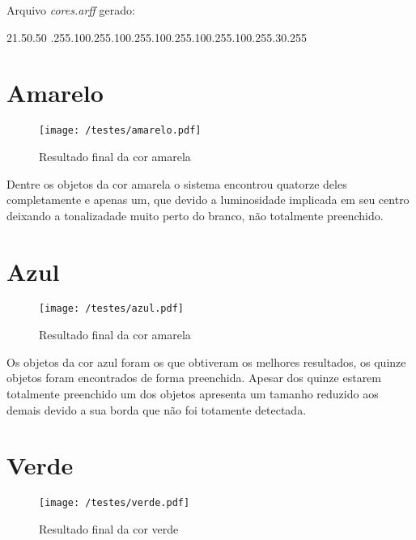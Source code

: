 	
Arquivo \textit{cores.arff} gerado:
\begin{center}
21.50.50 .255.100.255.100.255.100.255.100.255.100.255.30.255\newline
\end{center}
\section{Amarelo}
	\begin{figure}[H]
		\centering
		\texttt{[image: /testes/amarelo.pdf]}
		\caption{Resultado final da cor amarela}
		\label{disposicaoparte}
	\end{figure}
	
	Dentre os objetos da cor amarela o sistema encontrou quatorze deles completamente e apenas um, que devido a luminosidade implicada em seu centro deixando a tonalizadade muito perto do branco, não totalmente preenchido.
\section{Azul}
	\begin{figure}[H]
		\centering
		\texttt{[image: /testes/azul.pdf]}
		\caption{Resultado final da cor amarela}
		\label{disposicaoparte}
	\end{figure}

Os objetos da cor azul foram os que obtiveram os melhores resultados, os quinze objetos foram encontrados de forma preenchida.	Apesar dos quinze estarem totalmente preenchido um dos objetos apresenta um tamanho reduzido aos demais devido a sua borda que não foi totamente detectada.

\section{Verde}
	\begin{figure}[H]
		\centering
		\texttt{[image: /testes/verde.pdf]}
		\caption{Resultado final da cor verde}
		\label{disposicaoparte}
	\end{figure}


